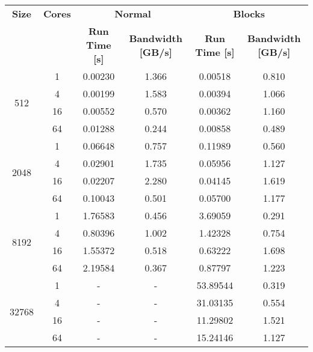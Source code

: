 \begin{tabularx}{\textwidth}{@{} c c c c c c @{}}
    \caption{\label{table:scale-strong}Strong scaling}\\
    \toprule
        \textbf{Size} & \textbf{Cores} & \multicolumn{2}{c}{\textbf{Normal}} & \multicolumn{2}{c}{\textbf{Blocks}}\\
        \cmidrule(lr){3-4}\cmidrule(lr){5-6}
        & & \textbf{Run Time [s]} & \textbf{Bandwidth [GB/s]} & \textbf{Run Time [s]} & \textbf{Bandwidth [GB/s]} \\
    \midrule
    \endhead
        \multirow{4}{*}{512} & 1  & 0.00230 & 1.366	& 0.00518 & 0.810 \\
                             & 4  & 0.00199 & 1.583 & 0.00394 & 1.066 \\
                             & 16 & 0.00552 & 0.570 & 0.00362 & 1.160 \\
                             & 64 & 0.01288 & 0.244 & 0.00858 & 0.489 \\
    \midrule
        \multirow{4}{*}{2048} & 1  & 0.06648 & 0.757 & 0.11989 & 0.560 \\
                              & 4  & 0.02901 & 1.735 & 0.05956 & 1.127 \\
                              & 16 & 0.02207 & 2.280 & 0.04145 & 1.619 \\
                              & 64 & 0.10043 & 0.501 & 0.05700 & 1.177 \\
    \midrule
        \multirow{4}{*}{8192} & 1  & 1.76583 & 0.456 & 3.69059 & 0.291 \\
                              & 4  & 0.80396 & 1.002 & 1.42328 & 0.754 \\
                              & 16 & 1.55372 & 0.518 & 0.63222 & 1.698 \\
                              & 64 & 2.19584 & 0.367 & 0.87797 & 1.223 \\
    \midrule
        \multirow{4}{*}{32768} & 1  & - & - & 53.89544 & 0.319 \\
                               & 4  & - & - & 31.03135 & 0.554 \\
                               & 16 & - & - & 11.29802 & 1.521 \\
                               & 64 & - & - & 15.24146 & 1.127 \\
    \bottomrule
\end{tabularx}    
